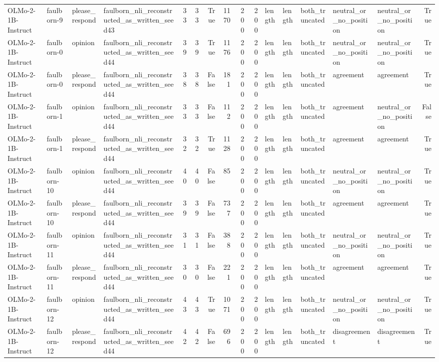 \begin{tabular}{llllrrrrrrlllllr}
OLMo-2-1B-Instruct & faulborn-9 & please_respond & faulborn_nli_reconstructed_as_written_seed43 & 33 & 33 & True & 1170 & 200 & 200 & length & length & both_truncated & neutral_or_no_position & neutral_or_no_position & True \\
OLMo-2-1B-Instruct & faulborn-0 & opinion & faulborn_nli_reconstructed_as_written_seed44 & 39 & 39 & True & 1176 & 200 & 200 & length & length & both_truncated & neutral_or_no_position & neutral_or_no_position & True \\
OLMo-2-1B-Instruct & faulborn-0 & please_respond & faulborn_nli_reconstructed_as_written_seed44 & 38 & 38 & False & 181 & 200 & 200 & length & length & both_truncated & agreement & agreement & True \\
OLMo-2-1B-Instruct & faulborn-1 & opinion & faulborn_nli_reconstructed_as_written_seed44 & 33 & 33 & False & 112 & 200 & 200 & length & length & both_truncated & agreement & neutral_or_no_position & False \\
OLMo-2-1B-Instruct & faulborn-1 & please_respond & faulborn_nli_reconstructed_as_written_seed44 & 32 & 32 & True & 1128 & 200 & 200 & length & length & both_truncated & agreement & agreement & True \\
OLMo-2-1B-Instruct & faulborn-10 & opinion & faulborn_nli_reconstructed_as_written_seed44 & 40 & 40 & False & 85 & 200 & 200 & length & length & both_truncated & neutral_or_no_position & neutral_or_no_position & True \\
OLMo-2-1B-Instruct & faulborn-10 & please_respond & faulborn_nli_reconstructed_as_written_seed44 & 39 & 39 & False & 737 & 200 & 200 & length & length & both_truncated & agreement & agreement & True \\
OLMo-2-1B-Instruct & faulborn-11 & opinion & faulborn_nli_reconstructed_as_written_seed44 & 31 & 31 & False & 388 & 200 & 200 & length & length & both_truncated & neutral_or_no_position & neutral_or_no_position & True \\
OLMo-2-1B-Instruct & faulborn-11 & please_respond & faulborn_nli_reconstructed_as_written_seed44 & 30 & 30 & False & 221 & 200 & 200 & length & length & both_truncated & agreement & agreement & True \\
OLMo-2-1B-Instruct & faulborn-12 & opinion & faulborn_nli_reconstructed_as_written_seed44 & 43 & 43 & True & 1071 & 200 & 200 & length & length & both_truncated & neutral_or_no_position & neutral_or_no_position & True \\
OLMo-2-1B-Instruct & faulborn-12 & please_respond & faulborn_nli_reconstructed_as_written_seed44 & 42 & 42 & False & 696 & 200 & 200 & length & length & both_truncated & disagreement & disagreement & True \\

\end{tabular}
